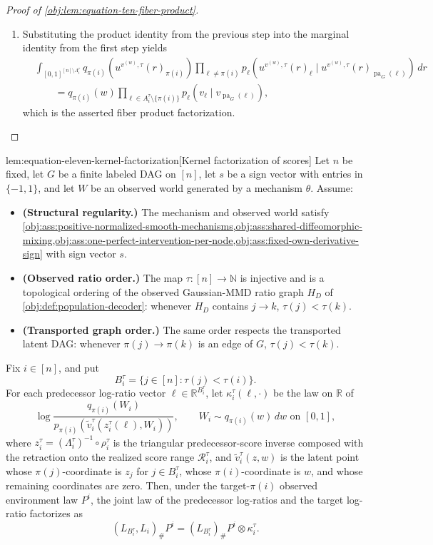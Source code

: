 \documentclass[11pt]{article}
\begin{document}
\begin{proof}[Proof of \cref{obj:lem:equation-ten-fiber-product}]
\begin{enumerate}
\item Substituting the product identity from the previous step into the marginal identity from the first step yields
\[
\begin{aligned}
&\int_{[0,1]^{[n]\setminus A_i^\tau}}
q_{\pi(i)}\!\left(u^{v^{(w)},\tau}(r)_{\pi(i)}\right)
\prod_{\ell\ne\pi(i)}
p_\ell\!\left(u^{v^{(w)},\tau}(r)_\ell\mid
u^{v^{(w)},\tau}(r)_{\operatorname{pa}_G(\ell)}\right)\,dr\\
&\qquad =
q_{\pi(i)}(w)
\prod_{\ell\in A_i^\tau\setminus\{\pi(i)\}}
p_\ell\!\left(v_\ell\mid v_{\operatorname{pa}_G(\ell)}\right),
\end{aligned}
\]
which is the asserted fiber product factorization. %
\end{enumerate}
\end{proof}

\begin{lemmav}{lem:equation-eleven-kernel-factorization}[Kernel factorization of scores]
Let \(n\) be fixed, let \(G\) be a finite labeled DAG on \([n]\), let \(s\) be a sign vector with entries in \(\{-1,1\}\), and let \(W\) be an observed world generated by a mechanism \(\theta\). Assume:
\begin{itemize}
\item \textbf{(Structural regularity.)} The mechanism and observed world satisfy \cref{obj:ass:positive-normalized-smooth-mechanisms,obj:ass:shared-diffeomorphic-mixing,obj:ass:one-perfect-intervention-per-node,obj:ass:fixed-own-derivative-sign} with sign vector \(s\).
\item \textbf{(Observed ratio order.)} The map \(\tau:[n]\to\mathbb N\) is injective and is a topological ordering of the observed Gaussian-MMD ratio graph \(H_D\) of \cref{obj:def:population-decoder}: whenever \(H_D\) contains \(j\to k\), \(\tau(j)<\tau(k)\).
\item \textbf{(Transported graph order.)} The same order respects the transported latent DAG: whenever \(\pi(j)\to\pi(k)\) is an edge of \(G\), \(\tau(j)<\tau(k)\).
\end{itemize}
Fix \(i\in[n]\), and put
\[
B_i^\tau=\{j\in[n]:\tau(j)<\tau(i)\}.
\]
For each predecessor log-ratio vector \(\ell\in\mathbb R^{B_i^\tau}\), let \(\kappa_i^\tau(\ell,\cdot)\) be the law on \(\mathbb R\) of
\[
\log\frac{q_{\pi(i)}(W_i)}{p_{\pi(i)}\!\left(\widetilde v_i^\tau(z_i^\tau(\ell),W_i)\right)},
\qquad W_i\sim q_{\pi(i)}(w)\,dw \text{ on }[0,1],
\]
where \(z_i^\tau=(\Lambda_i^\tau)^{-1}\circ\rho_i^\tau\) is the triangular predecessor-score inverse composed with the retraction onto the realized score range \(\mathcal R_i^\tau\), and \(\widetilde v_i^\tau(z,w)\) is the latent point whose \(\pi(j)\)-coordinate is \(z_j\) for \(j\in B_i^\tau\), whose \(\pi(i)\)-coordinate is \(w\), and whose remaining coordinates are zero. Then, under the target-\(\pi(i)\) observed environment law \(P^i\), the joint law of the predecessor log-ratios and the target log-ratio factorizes as
\[
(L_{B_i^\tau},L_i)_{\#}P^i
=
(L_{B_i^\tau})_{\#}P^i\otimes \kappa_i^\tau .
\]
\end{lemmav}
\end{document}

